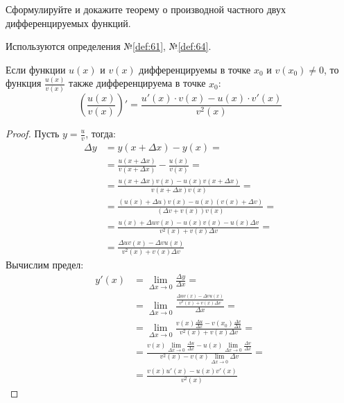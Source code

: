 \begin{question}
    Сформулируйте и докажите теорему о производной частного двух дифференцируемых функций.
\end{question}
\begin{used}
    Используются определения №\ref{def:61}, №\ref{def:64}.
\end{used}
\begin{theorem}
    Если функции $u(x)$ и $v(x)$ дифференцируемы в точке $x_0$ и $v(x_0) \neq 0$, то функция $\frac{u(x)}{v(x)}$ также дифференцируема в точке $x_0$: \[
        \left(\frac{u(x)}{v(x)}\right)' = \frac{u'(x) \cdot v(x) - u(x) \cdot v'(x)}{v^2(x)}
    \]
\end{theorem}
\begin{proof}
    Пусть $y = \frac{u}{v}$, тогда:
    \begin{align*}
        \Delta y &= y(x + \Delta x) - y(x) = \\
                 &= \frac{u(x + \Delta x)}{v(x + \Delta x)} - \frac{u(x)}{v(x)} = \\
                 &= \frac{u(x + \Delta x)v(x) - u(x)v(x + \Delta x)}{v(x + \Delta x)v(x)} = \\
                 &= \frac{(u(x) + \Delta u)v(x) - u(x)(v(x) + \Delta v)}{(\Delta v + v(x))v(x)} = \\
                 &= \frac{u(x) + \Delta u v(x) - u(x)v(x) - u(x)\Delta v}{v^2(x) + v(x) \Delta v} = \\
                 &= \frac{\Delta u v(x) - \Delta v u(x)}{v^2(x) + v(x) \Delta v}
    \end{align*}
    Вычислим предел:
    \begin{align*}
        y'(x) &= \lim_{\Delta x \to 0} \frac{\Delta y}{\Delta x} = \\
              &= \lim_{\Delta x \to 0} \frac{\frac{\Delta u v(x) - \Delta v u(x)}{v^2(x) + v(x) \Delta v}}{\Delta x} = \\
              &= \lim_{\Delta x \to 0} \frac{v(x) \frac{\Delta u}{\Delta x} - v(x_0) \frac{\Delta v}{\Delta x}}{v^2(x) + v(x) \Delta v} = \\
              &= \frac{v(x) \lim_{\Delta x \to 0} \frac{\Delta u}{\Delta x} - u(x) \lim_{\Delta x \to 0}  \frac{\Delta v}{\Delta x}}{v^2(x) - v(x) \lim_{\Delta x \to 0} \Delta v} = \\
              &= \boxed{\frac{v(x) u'(x) - u(x) v'(x)}{v^2(x)}}
    \end{align*}
\end{proof}
\pagebreak



